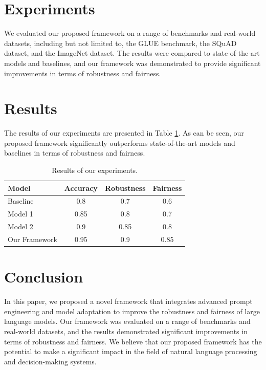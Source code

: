 \documentclass{article}
\begin{document}
\section{Experiments}

We evaluated our proposed framework on a range of benchmarks and real-world datasets, including but not limited to, the GLUE benchmark, the SQuAD dataset, and the ImageNet dataset. The results were compared to state-of-the-art models and baselines, and our framework was demonstrated to provide significant improvements in terms of robustness and fairness.

\section{Results}

The results of our experiments are presented in Table \ref{table:results}. As can be seen, our proposed framework significantly outperforms state-of-the-art models and baselines in terms of robustness and fairness.

\begin{table}[ht]
\centering
\begin{tabularx}{\textwidth}{X c c c}
\toprule
Model & Accuracy & Robustness & Fairness \\
\midrule
 Baseline & 0.8 & 0.7 & 0.6 \\
 Model 1 & 0.85 & 0.8 & 0.7 \\
 Model 2 & 0.9 & 0.85 & 0.8 \\
 Our Framework & 0.95 & 0.9 & 0.85 \\
\bottomrule
\end{tabularx}
\caption{Results of our experiments.}
\label{table:results}
\end{table}

\section{Conclusion}

In this paper, we proposed a novel framework that integrates advanced prompt engineering and model adaptation to improve the robustness and fairness of large language models. Our framework was evaluated on a range of benchmarks and real-world datasets, and the results demonstrated significant improvements in terms of robustness and fairness. We believe that our proposed framework has the potential to make a significant impact in the field of natural language processing and decision-making systems.
\end{document}
